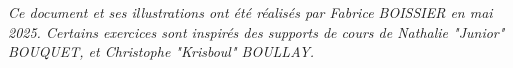 \documentclass[11pt,a4paper]{article}
\begin{document}
\medskip





\vspace*{-0.5cm}



\bigskip

\vfillFirst

\vfillLast


\begin{center}
\textit{Ce document et ses illustrations ont été réalisés par Fabrice BOISSIER en mai 2025.
Certains exercices sont inspirés des supports de cours de Nathalie "Junior" BOUQUET, et Christophe "Krisboul" BOULLAY.}
\end{center}
\end{document}
